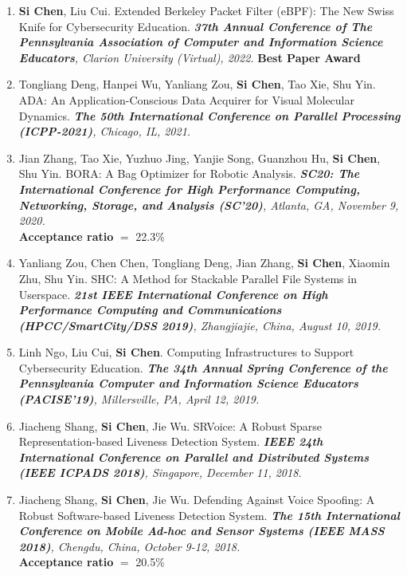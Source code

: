 \documentclass[letter]{article}
\newcommand{\publication}[4]{\item #1. #2. \emph{#3.} #4}
\begin{document}
\begin{description}
\begin{enumerate}[{C-}1.]
\publication{\textbf{Si Chen}, Liu Cui} {Extended Berkeley Packet Filter (eBPF): The New Swiss Knife for Cybersecurity Education}  {\textbf{37th Annual Conference of The Pennsylvania Association of Computer and Information Science Educators}, Clarion University (Virtual), 2022}
\textbf{Best Paper Award}\\

\publication{Tongliang Deng, Hanpei Wu, Yanliang Zou, \textbf{Si Chen}, Tao Xie, Shu Yin} {ADA: An Application-Conscious Data Acquirer for Visual Molecular Dynamics}  {\textbf{The 50th International Conference on Parallel Processing (ICPP-2021)}, Chicago, IL, 2021}\\

\publication{Jian Zhang, Tao Xie, Yuzhuo Jing, Yanjie Song, Guanzhou Hu, \textbf{Si Chen}, Shu Yin} {BORA: A Bag Optimizer for Robotic Analysis}  {\textbf{SC20: The International Conference for High Performance Computing, Networking, Storage, and Analysis (SC'20)}, Atlanta, GA, November 9, 2020} \\ 
\textbf{Acceptance ratio} $=$ 22.3\% \\

\publication{Yanliang Zou, Chen Chen, Tongliang Deng, Jian Zhang, \textbf{Si Chen}, Xiaomin Zhu, Shu Yin} {SHC: A Method for Stackable Parallel File Systems in Userspace}  {\textbf{21st IEEE International Conference on High Performance Computing and Communications (HPCC/SmartCity/DSS 2019)}, Zhangjiajie, China, August 10, 2019} \\ 

\publication{Linh Ngo, Liu Cui, \textbf{Si Chen}} {Computing Infrastructures to Support Cybersecurity Education}  {\textbf{The 34th Annual Spring Conference of the Pennsylvania Computer and Information Science Educators (PACISE'19)}, Millersville, PA, April 12, 2019} \\

\publication{Jiacheng Shang, \textbf{Si Chen}, Jie Wu} {SRVoice: A Robust Sparse Representation-based Liveness Detection System}  {\textbf{IEEE 24th International Conference on Parallel and Distributed Systems (IEEE ICPADS 2018)}, Singapore, December 11, 2018} \\

\publication{Jiacheng Shang, \textbf{Si Chen}, Jie Wu} {Defending Against Voice Spoofing: A Robust Software-based Liveness Detection System}  {\textbf{The 15th International Conference on Mobile Ad-hoc and Sensor Systems (IEEE MASS 2018)}, Chengdu, China, October 9-12, 2018} \\
\textbf{Acceptance ratio} $=$ 20.5\% \\


\end{enumerate}
\end{description}
\end{document}
